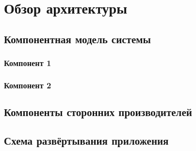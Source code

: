 \chapter{Обзор архитектуры}
	\section{Компонентная модель системы}
		\subsection{Компонент 1}
		
		\subsection{Компонент 2}
	\section{Компоненты сторонних производителей}

	\section{Схема развёртывания приложения}
